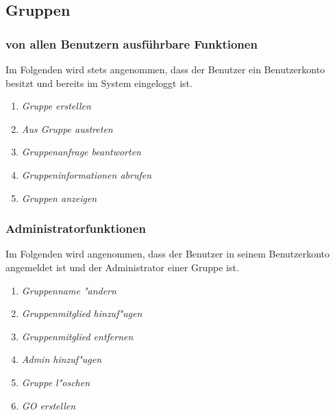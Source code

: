 \documentclass[parskip=full]{scrartcl}
\def\threedigits#1{%
  \ifnum#1<100 0\fi
  \ifnum#1<10 0\fi
  \number#1}
\begin{document}
\subsection{Gruppen}

\subsubsection{von allen Benutzern ausführbare Funktionen} %
Im Folgenden wird stets angenommen, dass der Benutzer ein Benutzerkonto besitzt und bereits im System eingeloggt ist.

\begin{enumerate}[label={\textbf{/F\protect\threedigits{\theenumi}0/}}, leftmargin=*]
	\item \textit{Gruppe erstellen}
	\item \textit{Aus Gruppe austreten}
	\item \textit{Gruppenanfrage beantworten} %
	\item \textit{Gruppeninformationen abrufen} %
	\item \textit{Gruppen anzeigen} %
\end{enumerate}

\subsubsection{Administratorfunktionen}
Im Folgenden wird angenommen, dass der Benutzer in seinem Benutzerkonto angemeldet ist und der Administrator einer Gruppe ist.

\begin{enumerate}[label={\textbf{/F\protect\threedigits{\theenumi}0/}}, leftmargin=*, resume]
	\item \textit{Gruppenname "andern}
	\item \textit{Gruppenmitglied hinzuf"ugen}
	\item \textit{Gruppenmitglied entfernen}	
	\item \textit{Admin hinzuf"ugen}
	\item \textit{Gruppe l"oschen}
	\item \textit{GO erstellen}
\end{enumerate}
	
\end{document}
